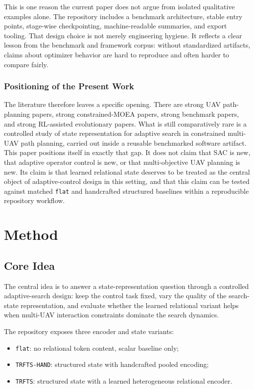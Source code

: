 \documentclass[a4paper,fleqn]{cas-dc}
\begin{document}
This is one reason the current paper does not argue from isolated qualitative examples alone. The repository includes a benchmark architecture, stable entry points, stage-wise checkpointing, machine-readable summaries, and export tooling. That design choice is not merely engineering hygiene. It reflects a clear lesson from the benchmark and framework corpus: without standardized artifacts, claims about optimizer behavior are hard to reproduce and often harder to compare fairly.

\subsubsection{Positioning of the Present Work}

The literature therefore leaves a specific opening. There are strong UAV path-planning papers, strong constrained-MOEA papers, strong benchmark papers, and strong RL-assisted evolutionary papers. What is still comparatively rare is a controlled study of state representation for adaptive search in constrained multi-UAV path planning, carried out inside a reusable benchmarked software artifact. This paper positions itself in exactly that gap. It does not claim that SAC is new, that adaptive operator control is new, or that multi-objective UAV planning is new. Its claim is that learned relational state deserves to be treated as the central object of adaptive-control design in this setting, and that this claim can be tested against matched \texttt{flat} and handcrafted structured baselines within a reproducible repository workflow.

\section{Method}

\subsection{Core Idea}

The central idea is to answer a state-representation question through a controlled adaptive-search design: keep the control task fixed, vary the quality of the search-state representation, and evaluate whether the learned relational variant helps when multi-UAV interaction constraints dominate the search dynamics.

The repository exposes three encoder and state variants:
\begin{itemize}
\item \texttt{flat}: no relational token content, scalar baseline only;
\item \texttt{TRFTS-HAND}: structured state with handcrafted pooled encoding;
\item \texttt{TRFTS}: structured state with a learned heterogeneous relational encoder.
\end{itemize}
\end{document}
